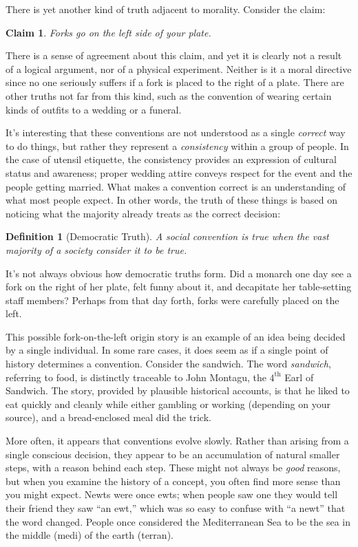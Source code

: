 \documentclass[9pt, twoside]{book}
\newtheorem*{defn}{Definition}
\newtheorem*{claim}{Claim}
\theoremstyle{argtstyle}
\begin{document}
There is yet another kind of truth adjacent to morality. Consider the claim:
\begin{claim}
    Forks go on the left side of your plate.
\end{claim}

There is a sense of agreement about this claim, and yet it is clearly not a
result of a logical argument, nor of a physical experiment. Neither is it
a moral directive since no one seriously suffers
if a fork is placed to the right of a plate.
There are other truths not far from this kind, such as
the convention of wearing certain kinds of outfits to a wedding or a funeral.

It's interesting that these conventions are not understood as a single
{\em correct} way to do things, but rather they represent a
{\em consistency} within a group of people.
In the case of utensil etiquette, the consistency provides an expression of
cultural status and awareness; proper wedding attire conveys respect for the
event and the people getting married.
What makes a convention correct is an understanding of what most people expect.
In other words, the truth of these things is based on noticing what
the majority already treats as the correct decision:
\begin{defn}[Democratic Truth]
    A social convention is true when the vast majority of a society consider it
    to be true.
\end{defn}

It's not always obvious how democratic truths form.
Did a monarch one day
see a fork on the right of her plate, felt funny about it, and decapitate her
table-setting staff members?
Perhaps from that day forth, forks were carefully
placed on the left.

This possible fork-on-the-left origin story is an example of an idea being
decided by a single individual.
In some rare cases, it does seem as if a single point of history determines a
convention.
Consider the sandwich.
The word {\em sandwich}, referring to food, is distinctly traceable to John
Montagu, the $4^\text{th}$ Earl of Sandwich. The story, provided by plausible
historical accounts, is that he liked to eat quickly and cleanly while either
gambling or working (depending on your source), and a bread-enclosed meal did
the trick.

More often, it appears that conventions evolve slowly. Rather than arising from
a single conscious decision, they appear to be an accumulation of natural
smaller steps, with a reason behind each step.
These might not always be {\em good} reasons,
but
when you examine the history of a concept,
you often find more sense
than you might expect. Newts were once ewts; when people saw one they would tell
their friend they saw ``an ewt,'' which was so easy to confuse with ``a newt''
that the word changed. People once considered the Mediterranean Sea to be the
sea in the middle (medi) of the earth (terran).
\end{document}
